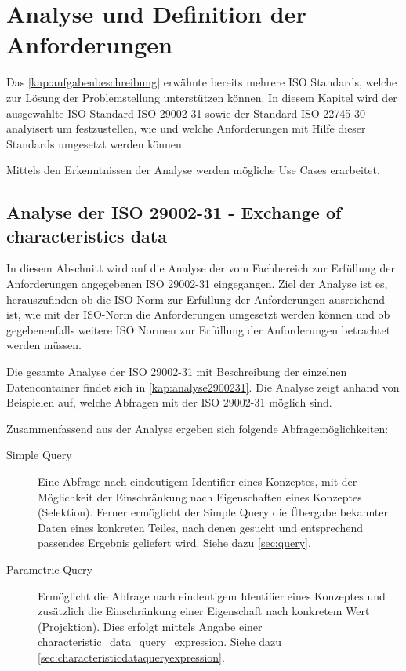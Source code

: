 \chapter{Analyse und Definition der Anforderungen } \label{kap:analyse_und_definition}

Das \autoref{kap:aufgabenbeschreibung} erwähnte bereits mehrere ISO Standards, welche zur Lösung der Problemstellung unterstützen können. In diesem Kapitel wird der ausgewählte ISO Standard ISO 29002-31 sowie der Standard ISO 22745-30 analyisert um festzustellen, wie und welche Anforderungen mit Hilfe dieser Standards umgesetzt werden können. 

Mittels den Erkenntnissen der Analyse werden mögliche Use Cases erarbeitet. 

\section{Analyse der ISO 29002-31 - Exchange of characteristics data}\label{kap:analyseiso2900231}

In diesem Abschnitt wird auf die Analyse der vom Fachbereich zur Erfüllung der Anforderungen angegebenen ISO 29002-31 eingegangen. Ziel der Analyse ist es, herauszufinden ob die ISO-Norm zur Erfüllung der Anforderungen ausreichend ist, wie mit der ISO-Norm die Anforderungen umgesetzt werden können und ob gegebenenfalls weitere ISO Normen zur Erfüllung der Anforderungen betrachtet werden müssen. 

Die gesamte Analyse der ISO 29002-31 mit Beschreibung der einzelnen Datencontainer findet sich in \autoref{kap:analyse2900231}. Die Analyse zeigt anhand von Beispielen auf, welche Abfragen mit der ISO 29002-31 möglich sind.

Zusammenfassend aus der Analyse ergeben sich folgende Abfragemöglichkeiten:
\begin{description}
\item[Simple Query] Eine Abfrage nach eindeutigem Identifier eines Konzeptes, mit der Möglichkeit der Einschränkung nach Eigenschaften eines Konzeptes (Selektion). Ferner ermöglicht der Simple Query die Übergabe bekannter Daten eines konkreten Teiles, nach denen gesucht und entsprechend passendes Ergebnis geliefert wird. Siehe dazu \autoref{sec:query}.
\item[Parametric Query] Ermöglicht die Abfrage nach eindeutigem Identifier eines Konzeptes und zusätzlich die Einschränkung einer Eigenschaft nach konkretem Wert (Projektion). Dies erfolgt mittels Angabe einer characteristic\_data\_query\_expression. Siehe dazu \autoref{sec:characteristicdataqueryexpression}.
\end{description}

